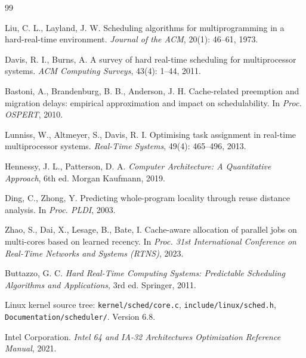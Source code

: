 
\clearpage
{}
\label{sec:refs}
\renewcommand{\refname}{参考资料}

\begin{thebibliography}{99}

Liu, C. L., Layland, J. W. Scheduling algorithms for multiprogramming in a hard-real-time environment.
\emph{Journal of the ACM}, 20(1): 46--61, 1973.

Davis, R. I., Burns, A. A survey of hard real-time scheduling for multiprocessor systems.
\emph{ACM Computing Surveys}, 43(4): 1--44, 2011.

Bastoni, A., Brandenburg, B. B., Anderson, J. H. Cache-related preemption and migration delays:
empirical approximation and impact on schedulability.
In \emph{Proc. OSPERT}, 2010.

Lunniss, W., Altmeyer, S., Davis, R. I. Optimising task assignment in real-time multiprocessor systems.
\emph{Real-Time Systems}, 49(4): 465--496, 2013.

Hennessy, J. L., Patterson, D. A. \emph{Computer Architecture: A Quantitative Approach}, 6th ed.
Morgan Kaufmann, 2019.

Ding, C., Zhong, Y. Predicting whole-program locality through reuse distance analysis.
In \emph{Proc. PLDI}, 2003.

Zhao, S., Dai, X., Lesage, B., Bate, I. Cache-aware allocation of parallel jobs on multi-cores
based on learned recency.
In \emph{Proc. 31st International Conference on Real-Time Networks and Systems (RTNS)}, 2023.

Buttazzo, G. C. \emph{Hard Real-Time Computing Systems: Predictable Scheduling Algorithms and
Applications}, 3rd ed. Springer, 2011.

Linux kernel source tree: \texttt{kernel/sched/core.c}, \texttt{include/linux/sched.h},
\texttt{Documentation/scheduler/}. Version 6.8.

Intel Corporation. \emph{Intel 64 and IA-32 Architectures Optimization Reference Manual}, 2021.

\end{thebibliography}